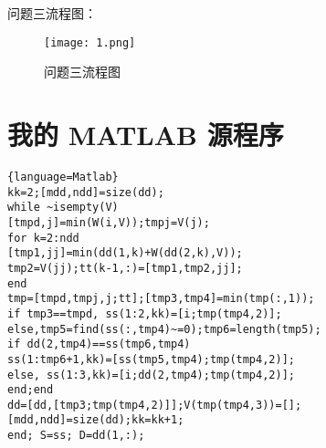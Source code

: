 \documentclass[withoutpreface,bwprint]{cumcmthesis}
\begin{document}
问题三流程图：
\begin{figure}[!h]
\centering
\texttt{[image: 1.png]}
\caption{问题三流程图}
\end{figure}


\nocite{*}


\newpage
\appendix
\section{我的 MATLAB 源程序}
\begin{lstlisting}{language=Matlab}
kk=2;[mdd,ndd]=size(dd);
while ~isempty(V)
[tmpd,j]=min(W(i,V));tmpj=V(j);
for k=2:ndd
[tmp1,jj]=min(dd(1,k)+W(dd(2,k),V));
tmp2=V(jj);tt(k-1,:)=[tmp1,tmp2,jj];
end
tmp=[tmpd,tmpj,j;tt];[tmp3,tmp4]=min(tmp(:,1));
if tmp3==tmpd, ss(1:2,kk)=[i;tmp(tmp4,2)];
else,tmp5=find(ss(:,tmp4)~=0);tmp6=length(tmp5);
if dd(2,tmp4)==ss(tmp6,tmp4)
ss(1:tmp6+1,kk)=[ss(tmp5,tmp4);tmp(tmp4,2)];
else, ss(1:3,kk)=[i;dd(2,tmp4);tmp(tmp4,2)];
end;end
dd=[dd,[tmp3;tmp(tmp4,2)]];V(tmp(tmp4,3))=[];
[mdd,ndd]=size(dd);kk=kk+1;
end; S=ss; D=dd(1,:);


 \end{lstlisting}
\end{document}
